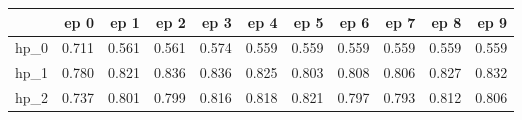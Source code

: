 \begin{tabular}{lrrrrrrrrrr}
\toprule
{} &   ep 0 &   ep 1 &   ep 2 &   ep 3 &   ep 4 &   ep 5 &   ep 6 &   ep 7 &   ep 8 &   ep 9 \\
\midrule
hp\_0 &  0.711 &  0.561 &  0.561 &  0.574 &  0.559 &  0.559 &  0.559 &  0.559 &  0.559 &  0.559 \\
hp\_1 &  0.780 &  0.821 &  0.836 &  0.836 &  0.825 &  0.803 &  0.808 &  0.806 &  0.827 &  0.832 \\
hp\_2 &  0.737 &  0.801 &  0.799 &  0.816 &  0.818 &  0.821 &  0.797 &  0.793 &  0.812 &  0.806 \\
\bottomrule
\end{tabular}
